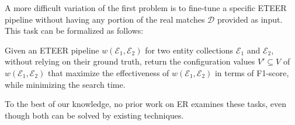 
A more difficult variation of the first problem is to fine-tune a specific ETEER pipeline without having any portion of the real matches $\mathcal{D}$ provided as input. This task can be formalized as follows:

\vspace{4pt}
\begin{problem}
\label{pr:pr2}
Given an ETEER pipeline $w(\mathcal{E}_1, \mathcal{E}_2)$ for two entity collections $\mathcal{E}_1$ and $\mathcal{E}_2$, {without relying on their ground truth}, return the configuration values $V' \subseteq V$ of $w(\mathcal{E}_1, \mathcal{E}_2)$ that maximize the effectiveness of $w(\mathcal{E}_1, \mathcal{E}_2)$ in terms of F1-score, while minimizing the search time.
\end{problem}
\vspace{4pt}

To the best of our knowledge, no prior work on ER examines these tasks, even though both can be solved by existing techniques. 